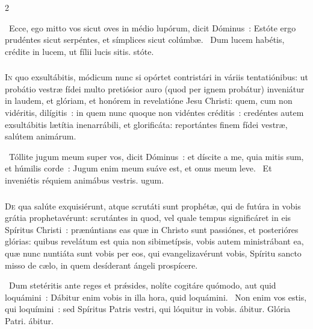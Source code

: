 \documentclass[9pt,twoside]{extarticle}
\begin{document}
\begin{multicols}{2}
{\begin{tightlist}{}
\item {}~Ecce, ego mitto vos sicut oves in médio lupórum, dicit Dóminus~: \textred{*} Estóte ergo prudéntes sicut serpéntes, et símplices sicut colúmbæ. ~Dum lucem habétis, crédite in lucem, ut fílii lucis sitis. stóte.
\end{tightlist}

\subsubsection*{\center {}}
\lettrine{I}n quo exsultábitis, módicum nunc si opórtet contristári in váriis tentatiónibus:
ut probátio vestræ fídei multo pretiósior auro (quod per ignem probátur) inveniátur in laudem, et glóriam, et honórem in revelatióne Jesu Christi:
quem, cum non vidéritis, dilígitis~: in quem nunc quoque non vidéntes créditis~: credéntes autem exsultábitis lætítia inenarrábili, et glorificáta:
reportántes finem fídei vestræ, salútem animárum.

\begin{tightlist}{}
\item {}~Tóllite jugum meum super vos, dicit Dóminus~: et díscite a me, quia mitis sum, et húmilis corde~: \textred{*} Jugum enim meum suáve est, et onus meum leve. ~Et inveniétis réquiem animábus vestris. ugum.
\end{tightlist}

\subsubsection*{\center {}}
\lettrine{D}e qua salúte exquisiérunt, atque scrutáti sunt prophétæ, qui de futúra in vobis grátia prophetavérunt:
scrutántes in quod, vel quale tempus significáret in eis Spíritus Christi~: prænúntians eas quæ in Christo sunt passiónes, et posterióres glórias:
quibus revelátum est quia non sibimetípsis, vobis autem ministrábant ea, quæ nunc nuntiáta sunt vobis per eos, qui evangelizavérunt vobis, Spíritu sancto misso de cælo, in quem desíderant ángeli prospícere.

\begin{tightlist}{}
\item {}~Dum stetéritis ante reges et prǽsides, nolíte cogitáre quómodo, aut quid loquámini~: \textred{*} Dábitur enim vobis in illa hora, quid loquámini. ~Non enim vos estis, qui loquímini~: sed Spíritus Patris vestri, qui lóquitur in vobis. ábitur. Glória Patri. ábitur.
\end{tightlist}

}
\end{multicols}
\end{document}
